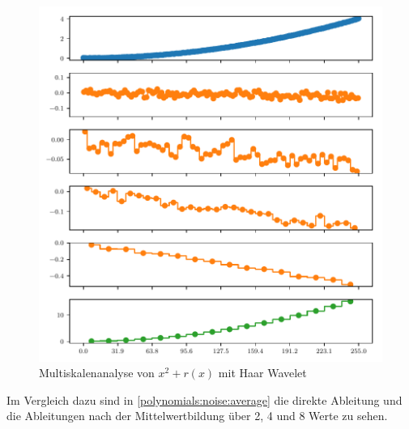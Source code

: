 \begin{refsection}
\begin{figure}
    \centering
    \includegraphics{papers/polynomials/images/polynomials_noise_db1_multi.pdf}
    \caption{Multiskalenanalyse von $x^2 + r(x)$ mit Haar Wavelet\label{polynomials:noise:db1_multi}}
\end{figure}

Im Vergleich dazu sind in \autoref{polynomials:noise:average} die direkte
Ableitung und die Ableitungen nach der Mittelwertbildung über 2, 4 und 8 Werte
zu sehen.


\end{refsection}
